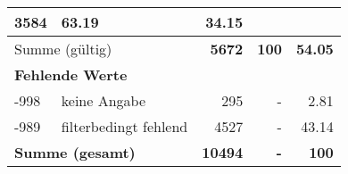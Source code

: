 \begin{longtable}{lXrrr}
       \num{3584} &
       \num[round-mode=places,round-precision=2]{63,19} &
         \num[round-mode=places,round-precision=2]{34,15} \\
     \midrule
     \multicolumn{2}{l}{Summe (gültig)} &
       \textbf{\num{5672}} &
     \textbf{100} &
       \textbf{\num[round-mode=places,round-precision=2]{54,05}} \\
     \multicolumn{5}{l}{\textbf{Fehlende Werte}}\\
       -998 &
       keine Angabe &
         \num{295} &
        - &
         \num[round-mode=places,round-precision=2]{2,81} \\
       -989 &
       filterbedingt fehlend &
         \num{4527} &
        - &
         \num[round-mode=places,round-precision=2]{43,14} \\
     \midrule
     \multicolumn{2}{l}{\textbf{Summe (gesamt)}} &
          \textbf{\num{10494}} &
        \textbf{-} &
        \textbf{100} \\
     \bottomrule
     \end{longtable}
     
